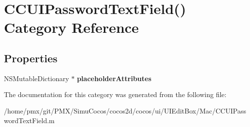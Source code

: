 \hypertarget{categoryCCUIPasswordTextField_07_08}{}\section{C\+C\+U\+I\+Password\+Text\+Field() Category Reference}
\label{categoryCCUIPasswordTextField_07_08}
\subsection*{Properties}
\begin{DoxyCompactItemize}
\item 
\mbox{\label{categoryCCUIPasswordTextField_07_08_accd133e2d749bfa907751c17f8488ddc}} 
N\+S\+Mutable\+Dictionary $\ast$ {\bfseries placeholder\+Attributes}
\end{DoxyCompactItemize}


The documentation for this category was generated from the following file\+:\begin{DoxyCompactItemize}
\item 
/home/pmx/git/\+P\+M\+X/\+Simu\+Cocos/cocos2d/cocos/ui/\+U\+I\+Edit\+Box/\+Mac/C\+C\+U\+I\+Password\+Text\+Field.\+m\end{DoxyCompactItemize}
